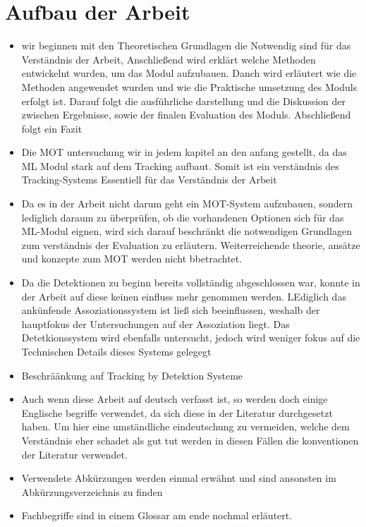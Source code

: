 \section{Aufbau der Arbeit}
\begin{itemize}
    \item wir beginnen mit den Theoretischen Grundlagen die Notwendig sind für das Verständnis der Arbeit, Anschließend wird erklärt welche Methoden entwickelnt wurden, um das Modul aufzubauen. Danch wird erläutert wie die Methoden angewendet wurden und wie die Praktische umsetzung des Moduls erfolgt ist. Darauf folgt die ausführliche darstellung und die Diskussion der zwischen Ergebnisse, sowie der finalen Evaluation des Moduls. Abschließend folgt ein Fazit 
    \item Die \gls{MOT} untersuchung wir in jedem kapitel an den anfang gestellt, da das \gls{ML} Modul stark auf dem Tracking aufbaut. Somit ist ein verständnis des Tracking-Systems Essentiell für das Verständnis der Arbeit
    \item Da es in der Arbeit nicht darum geht ein \gls{MOT}-System aufzubauen, sondern lediglich daraum zu überprüfen, ob die vorhandenen Optionen sich für das \gls{ML}-Modul eignen, wird sich darauf beschränkt die notwendigen Grundlagen zum verständnis der Evaluation zu erläutern. Weiterreichende theorie, ansätze und konzepte zum \gls{MOT} werden nicht bbetrachtet.
    \item Da die Detektionen zu beginn bereits vollständig abgeschlossen war, konnte in der Arbeit auf diese keinen einfluss mehr genommen werden. LEdiglich das ankünfende Assoziationssystem ist ließ sich beeinflussen, weshalb der hauptfokus der Untersuchungen auf der Assoziation liegt. Das Detetkionssystem wird ebenfalls untersucht, jedoch wird weniger fokus auf die Technischen Details dieses Systems gelegegt 
    \item Beschräänkung auf Tracking by Detektion Systeme
    \item Auch wenn diese Arbeit auf deutsch verfasst ist, so werden doch einige Englische begriffe verwendet, da sich diese in der Literatur durchgesetzt haben. Um hier eine umständliche eindeutschung zu vermeiden, welche dem Verständnis eher schadet als gut tut werden in diesen Fällen die konventionen der Literatur verwendet.
    \item Verwendete Abkürzungen werden einmal erwähnt und sind ansonsten im Abkürzungsverzeichnis zu finden 
    \item Fachbegriffe sind in einem Glossar am ende nochmal erläutert.
\end{itemize} 
